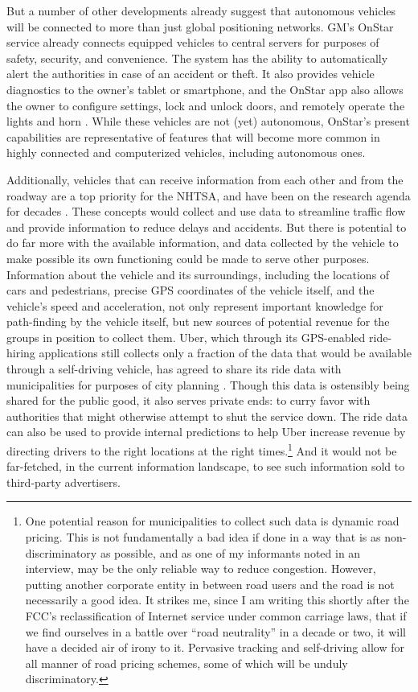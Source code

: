 But a number of other developments already suggest that autonomous
vehicles will be connected to more than just global positioning
networks. GM's OnStar service already connects equipped vehicles to central servers for
purposes of safety, security, and convenience. The system has the
ability to automatically alert the authorities in case of an accident
or theft. It also provides vehicle diagnostics to the owner's tablet
or smartphone, and the OnStar app also allows the owner to configure settings, lock and
unlock doors, and remotely operate the lights and horn \cite{onstar}.
While these vehicles are not (yet) autonomous, OnStar's present
capabilities are representative of features that will become more common in highly
connected and computerized vehicles, including autonomous ones.

Additionally, vehicles that can receive information from each other and from the
roadway are a top priority for the NHTSA, and have been on the
research agenda for decades \cite[p. 11]{wetmore}. These concepts would
collect and use data to streamline traffic flow and provide
information to reduce delays and accidents. But there is potential to
do far more with the available information,
and data collected by the vehicle to make possible its own functioning
could be made to serve other purposes. Information about the vehicle
and its surroundings, including the locations of cars and pedestrians,
precise GPS coordinates of the vehicle itself, and the vehicle's speed
and acceleration, not only represent important knowledge for
path-finding by the vehicle itself, but new sources of potential
revenue for the groups in position to collect them. Uber, which
through its GPS-enabled ride-hiring applications still collects only a
fraction of the data that would be available through a self-driving
vehicle, has agreed to share its ride data with municipalities for purposes of
city planning \cite{uberJardin}. Though this data is ostensibly being
shared for the public good, it also serves private ends: to curry favor with
authorities that might otherwise attempt to shut the service down. The
ride data can also be used to provide internal predictions to help
Uber increase revenue by directing drivers to the right locations at
the right times.\footnote{One potential reason for municipalities to
  collect such data is dynamic road pricing. This is not fundamentally
a bad idea if done in a way that is as non-discriminatory as possible,
and as one of my informants noted in an interview, may be 
the only reliable way to reduce congestion. However, putting another
corporate entity in between road users and the road is not necessarily
a good idea. It strikes me, since I am writing this shortly after the
FCC's reclassification of Internet service under common carriage laws,
that if we find ourselves in a battle over ``road neutrality'' in a
decade or two, it will have a decided air of irony to it. Pervasive
tracking and self-driving allow for all manner of road pricing
schemes, some of which will be unduly discriminatory.} And it would
not be far-fetched, in the current 
information landscape, to see such information sold to third-party advertisers.

